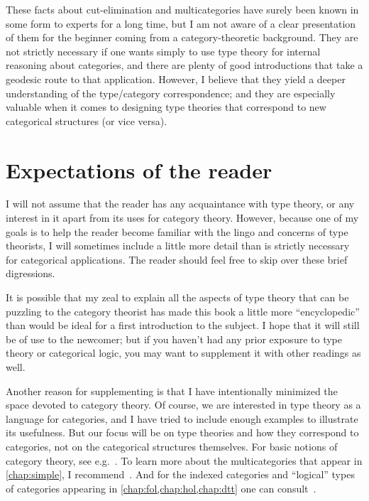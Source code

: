 These facts about cut-elimination and multicategories have surely been known in some form to experts for a long time, but I am not aware of a clear presentation of them for the beginner coming from a category-theoretic background.
They are not strictly necessary if one wants simply to use type theory for internal reasoning about categories, and there are plenty of good introductions that take a geodesic route to that application.
However, I believe that they yield a deeper understanding of the type/category correspondence; and they are especially valuable when it comes to designing type theories that correspond to new categorical structures (or vice versa).

\section{Expectations of the reader}
\label{sec:expectations}

I will not assume that the reader has any acquaintance with type theory, or any interest in it apart from its uses for category theory.
However, because one of my goals is to help the reader become familiar with the lingo and concerns of type theorists, I will sometimes include a little more detail than is strictly necessary for categorical applications.
The reader should feel free to skip over these brief digressions.

It is possible that my zeal to explain all the aspects of type theory that can be puzzling to the category theorist has made this book a little more ``encyclopedic'' than would be ideal for a first introduction to the subject.
I hope that it will still be of use to the newcomer; but if you haven't had any prior exposure to type theory or categorical logic, you may want to supplement it with other readings as well.

Another reason for supplementing is that I have intentionally minimized the space devoted to category theory.
Of course, we are interested in type theory as a language for categories, and I have tried to include enough examples to illustrate its usefulness.
But our focus will be on type theories and how they correspond to categories, not on the categorical structures themselves.
For basic notions of category theory, see e.g.~\cite{maclane,awodey:cat-thy,mclarty:ecat-etop,leinster:cat-thy}.
To learn more about the multicategories that appear in \cref{chap:simple}, I recommend~\cite{leinster:higher-opds,cs:multicats}.
And for the indexed categories and ``logical'' types of categories appearing in \cref{chap:fol,chap:hol,chap:dtt} one can consult~\cite{mm:shv-gl,ptj:topos-theory,ptj:elephant,jacobs:cltt}.

